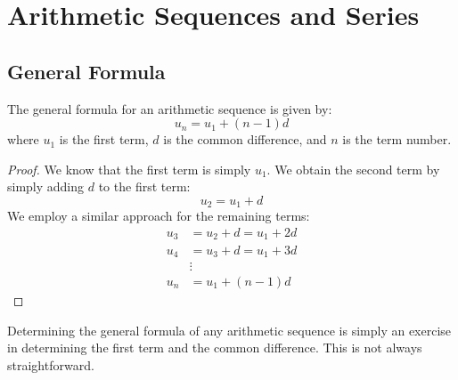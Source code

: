\chapter{Arithmetic Sequences and Series}

\section{General Formula}

\begin{proposition}\label{prop:arithmetic-general-formula}
	The general formula for an arithmetic sequence is given by:
	\begin{equation*}
		u_n = u_1 + (n-1)d
	\end{equation*}
	where $u_1$ is the first term, $d$ is the common difference, and $n$ is the term number.
\end{proposition}
\begin{proof}
We know that the first term is simply $u_1$. We obtain the second term by simply adding $d$ to the first term:
\begin{equation*}
	u_2 = u_1 + d
\end{equation*}
We employ a similar approach for the remaining terms:
\begin{align*}
	u_3 &= u_2 + d = u_1 + 2d \\
	u_4 &= u_3 + d = u_1 + 3d \\
	&\vdots \\
	u_n &= u_1 + (n-1)d
\end{align*}
\end{proof}

Determining the general formula of any arithmetic sequence is simply an exercise
in determining the first term and the common difference. This is not always straightforward.


